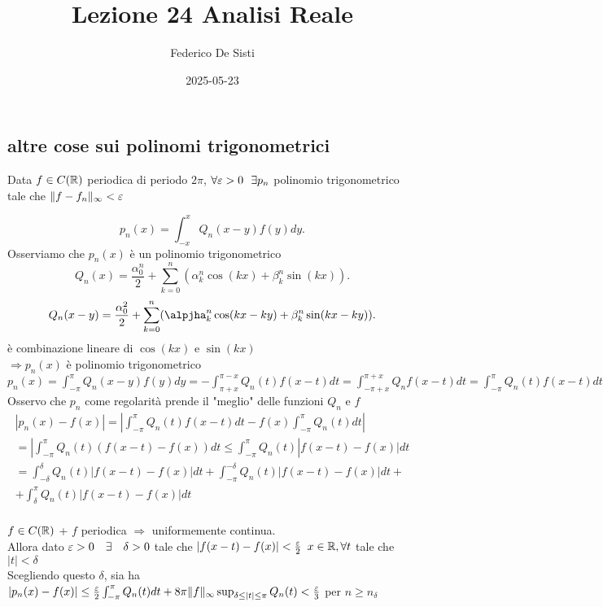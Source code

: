 \documentclass[12px]{article}
\title{Lezione 24 Analisi Reale}
\date{2025-05-23}
\author{Federico De Sisti}
\begin{document}
	\maketitle
	\newpage
	\subsection{altre cose sui polinomi trigonometrici}
	\begin{teo}[Weierstrass]
		Data $f\in C(\mathbb{R})$ periodica di periodo  $2\pi$,  $\forall \varepsilon > 0 \ \ \exists p_n$ polinomio trigonometrico tale che  $\|f-f_n\|_\infty < \varepsilon$
	\end{teo}
	\begin{dimo}
	 \[
		 p_n(x) = \int_{-x}^xQ_n(x-y)f(y)dy
	.\] 
	Osserviamo che $p_n(x)$ è un polinomio trigonometrico
	 \[
		 Q_n(x) = \frac{\alpha_0^n}{2} + \sum^{n}_{k=0} \left(\alpha_k^n \cos( k x) + \beta_k^n \sin(kx) \right)
	.\] 
	\[
		Q_n(x-y) = \frac{\alpha_0^2}{2} + \sum^{n}_{k=0}(\alpjha^n_k \cos(kx -ky) + \beta_k^n\sin(kx-ky))
	.\]  
	è combinazione lineare di $\cos(kx)$ e  $\sin(kx)$\\
	 $ \Rightarrow p_n(x)$ è polinomio trigonometrico\\
	 $p_n(x) = \int_{-\pi}^\pi Q_n(x-y)f(y)dy = -\int^{\pi-x}_{\pi+x}Q_n(t)f(x-t)dt = \int^{\pi + x}_{-\pi+x}Q_nf(x-t)dt = \int^\pi_{-\pi}Q_n(t)f(x-t)dt$ \\
	 Osservo che $p_n$ come regolarità prende il "meglio" delle funzioni  $Q_n$ e  $f$
	  \begin{gather*}
		  |p_n(x)-f(x)| = |\int^\pi_{-\pi}Q_n(t)f(x-t)dt - f(x) \int^\pi_{-\pi}Q_n(t)dt|\\
		 = |\int^\pi_{-\pi}Q_n(t)( f(x-t)-f(x))dt
		 \leq \int_{-\pi}^\pi Q_n(t)|f(x-t)-f(x)|dt\\
		 = \int^\delta_{-\delta}Q_n(t)|f(x-t)-f(x)|dt + \int^{-\delta}_{-\pi}Q_n(t)|f(x-t)-f(x)|dt +\\+ \int^\pi_\delta Q_n(t)|f(x-t)-f(x)|dt
	 \end{gather*}\\
	 $f\in C(\mathbb{R})$ + $f$ periodica $ \Rightarrow $ uniformemente continua.\\
	 Allora dato $\e > 0 \ \ \ \exists \ \ \ \delta > 0 $ tale che  $|f(x-t)-f(x)| < \frac {\varepsilon}{2}$ $x\in \mathbb{R}, \forall t$ tale che  $|t|<\delta$\\
	 Scegliendo questo  $\delta$, sia ha  $|p_n(x)-f(x)| \leq \frac{\varepsilon}{2}\int^\pi_{-\pi}Q_n(t)dt + 8\pi\|f\|_\infty\sup_{\delta\leq|t|\leq\pi}Q_n(t) < \frac {\varepsilon}3 $ per $n\geq n_\delta$
	\end{dimo}
\end{document}
